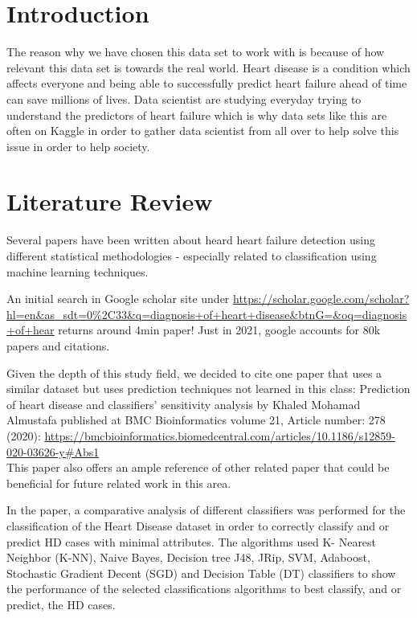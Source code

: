 \documentclass[
]{article}
\begin{document}
\section{Introduction}\label{introduction}

The reason why we have chosen this data set to work with is because of
how relevant this data set is towards the real world. Heart disease is a
condition which affects everyone and being able to successfully predict
heart failure ahead of time can save millions of lives. Data scientist
are studying everyday trying to understand the predictors of heart
failure which is why data sets like this are often on Kaggle in order to
gather data scientist from all over to help solve this issue in order to
help society.

\section{Literature Review}\label{literature-review}

Several papers have been written about heard heart failure detection
using different statistical methodologies - especially related to
classification using machine learning techniques.

An initial search in Google scholar site under
\url{https://scholar.google.com/scholar?hl=en&as_sdt=0\%2C33&q=diagnosis+of+heart+disease&btnG=&oq=diagnosis+of+hear}
returns around 4min paper! Just in 2021, google accounts for 80k papers
and citations.

Given the depth of this study field, we decided to cite one paper that
uses a similar dataset but uses prediction techniques not learned in
this class: Prediction of heart disease and classifiers' sensitivity
analysis by Khaled Mohamad Almustafa published at BMC Bioinformatics
volume 21, Article number: 278 (2020):
\url{https://bmcbioinformatics.biomedcentral.com/articles/10.1186/s12859-020-03626-y\#Abs1}\\
This paper also offers an ample reference of other related paper that
could be beneficial for future related work in this area.

In the paper, a comparative analysis of different classifiers was
performed for the classification of the Heart Disease dataset in order
to correctly classify and or predict HD cases with minimal attributes.
The algorithms used K- Nearest Neighbor (K-NN), Naive Bayes, Decision
tree J48, JRip, SVM, Adaboost, Stochastic Gradient Decent (SGD) and
Decision Table (DT) classifiers to show the performance of the selected
classifications algorithms to best classify, and or predict, the HD
cases.
\end{document}
